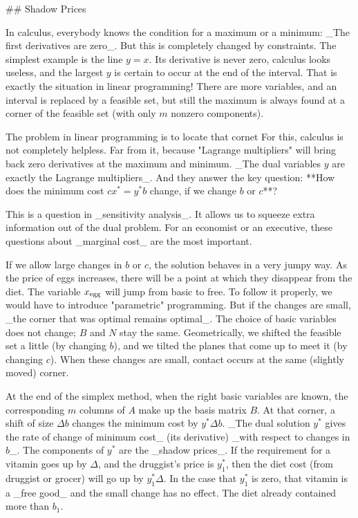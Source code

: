 

## Shadow Prices

In calculus, everybody knows the condition for a maximum or a minimum: _The first derivatives are zero_. But this is completely changed by constraints. The simplest example is the line \(y=x\). Its derivative is never zero, calculus looks useless, and the largest \(y\) is certain to occur at the end of the interval. That is exactly the situation in linear programming! There are more variables, and an interval is replaced by a feasible set, but still the maximum is always found at a corner of the feasible set (with only \(m\) nonzero components).

The problem in linear programming is to locate that cornet For this, calculus is not completely helpless. Far from it, because "Lagrange multipliers" will bring back zero derivatives at the maximum and minimum. _The dual variables \(y\) are exactly the Lagrange multipliers_. And they answer the key question: **How does the minimum cost \(cx^{*}=y^{*}b\) change, if we change \(b\) or \(c\)**?

This is a question in _sensitivity analysis_. It allows us to squeeze extra information out of the dual problem. For an economist or an executive, these questions about _marginal cost_ are the most important.

If we allow large changes in \(b\) or \(c\), the solution behaves in a very jumpy way. As the price of eggs increases, there will be a point at which they disappear from the diet. The variable \(x_{\rm egg}\) will jump from basic to free. To follow it properly, we would have to introduce "parametric" programming. But if the changes are small, _the corner that was optimal remains optimal_. The choice of basic variables does not change; \(B\) and \(N\) stay the same. Geometrically, we shifted the feasible set a little (by changing \(b\)), and we tilted the planes that come up to meet it (by changing \(c\)). When these changes are small, contact occurs at the same (slightly moved) corner.

At the end of the simplex method, when the right basic variables are known, the corresponding \(m\) columns of \(A\) make up the basis matrix \(B\). At that corner, a shift of size \(\Delta b\) changes the minimum cost by \(y^{*}\Delta b\). _The dual solution \(y^{*}\) gives the rate of change of minimum cost_ (its derivative) _with respect to changes in \(b\)_. The components of \(y^{*}\) are the _shadow prices_. If the requirement for a vitamin goes up by \(\Delta\), and the druggist's price is \(y^{*}_{1}\), then the diet cost (from druggist or grocer) will go up by \(y^{*}_{1}\Delta\). In the case that \(y^{*}_{1}\) is zero, that vitamin is a _free good_ and the small change has no effect. The diet already contained more than \(b_{1}\).

